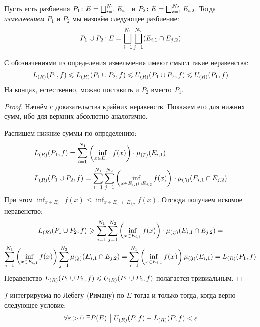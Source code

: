\begin{definition}
	Пусть есть разбиения $P_1 \colon E = \bigsqcup_{i = 1}^{N_1} E_{i, 1}$ и $P_2 \colon E = \bigsqcup_{i = 1}^{N_2} E_{i, 2}$. Тогда \textit{измельчением} $P_1$ и $P_2$ мы назовём следующее разбиение:
	\[
		P_1 \cup P_2 \colon E = \bigsqcup_{i = 1}^{N_1} \bigsqcup_{j = 1}^{N_2} (E_{i, 1} \cap E_{j, 2})
	\]
\end{definition}

\begin{proposition}
	С обозначениями из определения измельчения имеют смысл такие неравенства:
	\[
		L_{(R)}(P_1, f) \leqslant L_{(R)}(P_1 \cup P_2, f) \leqslant U_{(R)}(P_1 \cup P_2, f) \leqslant U_{(R)}(P_1, f)
	\]
	На концах, естественно, можно поставить и $P_2$ вместо $P_1$.
\end{proposition}

\begin{proof}
	Начнём с доказательства крайних неравенств. Покажем его для нижних сумм, ибо для верхних абсолютно аналогично.
	
	Распишем нижние суммы по определению:
	\begin{align*}
		&{L_{(R)}(P_1, f) = \sum_{i = 1}^{N_1} \left(\inf_{x \in E_{i, 1}} f(x)\right) \cdot \operatorname{\mu_{(\mathfrak{J})}}(E_{i, 1})}
		\\
		&{L_{(R)}(P_1 \cup P_2, f) = \sum_{i = 1}^{N_1} \sum_{j = 1}^{N_2} \left(\inf_{x \in E_{i, 1} \cap E_{j, 2}} f(x)\right) \cdot \operatorname{\mu_{(\mathfrak{J})}}(E_{i, 1} \cap E_{j, 2})}
	\end{align*}
	При этом $\inf_{x \in E_{i, 1}} f(x) \le \inf_{x \in E_{i, 1} \cap E_{j, 2}} f(x)$. Отсюда получаем искомое неравенство:
	\begin{multline*}
		L_{(R)}(P_1 \cup P_2, f) \geqslant \sum_{i = 1}^{N_1} \sum_{j = 1}^{N_2} \left(\inf_{x \in E_{i, 1}} f(x)\right) \cdot \operatorname{\mu_{(\mathfrak{J})}}(E_{i, 1} \cap E_{j, 2}) =
		\\
		\sum_{i = 1}^{N_1} \left(\inf_{x \in E_{i, 1}} f(x)\right) \sum_{j = 1}^{N_2} \operatorname{\mu_{(\mathfrak{J})}}(E_{i, 1} \cap E_{j, 2}) = \sum_{i = 1}^{N_1} \left(\inf_{x \in E_{i, 1}} f(x)\right) \operatorname{\mu_{(\mathfrak{J})}}(E_{i, 1}) = L_{(R)}(P_1, f)
	\end{multline*}
	Неравенство $L_{(R)}(P_1 \cup P_2, f) \leqslant U_{(R)}(P_1 \cup P_2, f)$ полагается тривиальным.
\end{proof}

\begin{proposition} \label{commonEquivLebeg}
	$f$ интегрируема по Лебегу (Риману) по $E$ тогда и только тогда, когда верно следующее условие:
	\[
		\forall \varepsilon > 0\ \exists P(E) \ \big|\  U_{(R)}(P, f) - L_{(R)}(P, f) < \varepsilon
	\]
\end{proposition}

